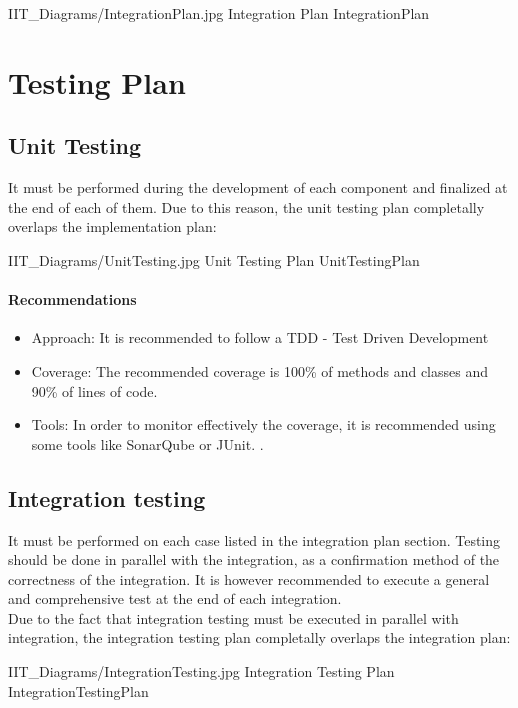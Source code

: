 \documentclass[../DD.tex]{subfiles}
\begin{document}
	\image {13cm} {IIT_Diagrams/IntegrationPlan.jpg} {Integration Plan} {IntegrationPlan}
	\newpage
	\section{Testing Plan}
		\subsection{Unit Testing}
		It must be performed during the development of each component and finalized at the end of each of them. Due to this reason, the unit testing plan completally overlaps the implementation plan:

		\image {13cm} {IIT_Diagrams/UnitTesting.jpg} {Unit Testing Plan} {UnitTestingPlan}
		
		\paragraph{Recommendations}
		\begin{itemize}
			\item Approach: It is recommended to follow a TDD - Test Driven Development 
			\item Coverage: The recommended coverage is 100\% of methods and classes and 90\% of lines of code.
			\item Tools: In order to monitor effectively the coverage, it is recommended using some tools like SonarQube or JUnit. .
		\end{itemize} 
		
		\subsection{Integration testing} It must be performed on each case listed in the integration plan section. Testing should be done in parallel with the integration, as a confirmation method of the correctness of the integration. It is however recommended to execute a general and comprehensive test at the end of each integration. \\
		Due to the fact that integration testing must be executed in parallel with integration, the integration testing plan completally overlaps the integration plan:

		\image {13cm} {IIT_Diagrams/IntegrationTesting.jpg} {Integration Testing Plan} {IntegrationTestingPlan}

\thispagestyle{fancy}
 
\end{document}
